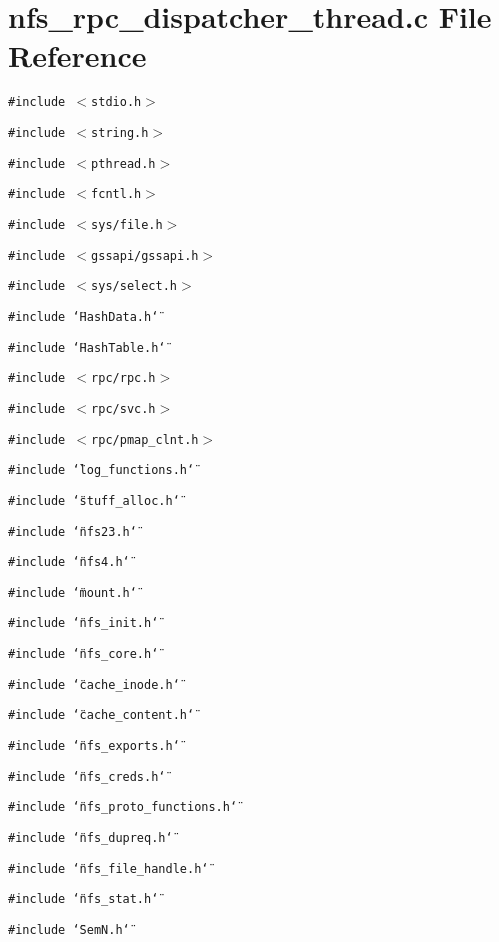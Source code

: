 \section{nfs\_\-rpc\_\-dispatcher\_\-thread.c File Reference}
\label{nfs__rpc__dispatcher__thread_8c}
{\tt \#include $<$stdio.h$>$}\par
{\tt \#include $<$string.h$>$}\par
{\tt \#include $<$pthread.h$>$}\par
{\tt \#include $<$fcntl.h$>$}\par
{\tt \#include $<$sys/file.h$>$}\par
{\tt \#include $<$gssapi/gssapi.h$>$}\par
{\tt \#include $<$sys/select.h$>$}\par
{\tt \#include \char`\"{}HashData.h\char`\"{}}\par
{\tt \#include \char`\"{}HashTable.h\char`\"{}}\par
{\tt \#include $<$rpc/rpc.h$>$}\par
{\tt \#include $<$rpc/svc.h$>$}\par
{\tt \#include $<$rpc/pmap\_\-clnt.h$>$}\par
{\tt \#include \char`\"{}log\_\-functions.h\char`\"{}}\par
{\tt \#include \char`\"{}stuff\_\-alloc.h\char`\"{}}\par
{\tt \#include \char`\"{}nfs23.h\char`\"{}}\par
{\tt \#include \char`\"{}nfs4.h\char`\"{}}\par
{\tt \#include \char`\"{}mount.h\char`\"{}}\par
{\tt \#include \char`\"{}nfs\_\-init.h\char`\"{}}\par
{\tt \#include \char`\"{}nfs\_\-core.h\char`\"{}}\par
{\tt \#include \char`\"{}cache\_\-inode.h\char`\"{}}\par
{\tt \#include \char`\"{}cache\_\-content.h\char`\"{}}\par
{\tt \#include \char`\"{}nfs\_\-exports.h\char`\"{}}\par
{\tt \#include \char`\"{}nfs\_\-creds.h\char`\"{}}\par
{\tt \#include \char`\"{}nfs\_\-proto\_\-functions.h\char`\"{}}\par
{\tt \#include \char`\"{}nfs\_\-dupreq.h\char`\"{}}\par
{\tt \#include \char`\"{}nfs\_\-file\_\-handle.h\char`\"{}}\par
{\tt \#include \char`\"{}nfs\_\-stat.h\char`\"{}}\par
{\tt \#include \char`\"{}SemN.h\char`\"{}}\par
